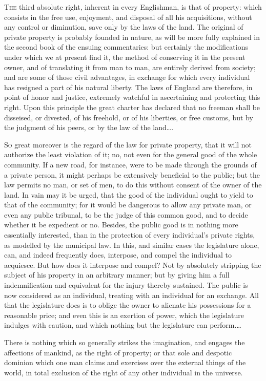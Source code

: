 
\textsc{The}
third absolute right, inherent in every Englishman, is that of property:
which consists in the free use, enjoyment, and disposal of all his
acquisitions, without any control or diminution, save only by the laws of the
land. The original of private property is probably founded in nature, as will
be more fully explained in the second book of the ensuing commentaries: but
certainly the modifications under which we at present find it, the method of
conserving it in the present owner, and of translating it from man to man, are
entirely derived from society; and are some of those civil advantages, in
exchange for which every individual has resigned a part of his natural liberty.
The laws of England are therefore, in point of honor and justice, extremely
watchful in ascertaining and protecting this right. Upon this principle the
great charter has declared that no freeman shall be disseised, or divested, of
his freehold, or of his liberties, or free customs, but by the judgment of his
peers, or by the law of the land\ldots.


\textsc{So}
great moreover is the regard of the law for private property, that it will
not authorize the least violation of it; no, not even for the general good of
the whole community. If a new road, for instance, were to be made through the
grounds of a private person, it might perhaps be extensively beneficial to the
public; but the law permits no man, or set of men, to do this without consent
of the owner of the land. In vain may it be urged, that the good of the
individual ought to yield to that of the community; for it would be dangerous
to allow any private man, or even any public tribunal, to be the judge of this
common good, and to decide whether it be expedient or no. Besides, the public
good is in nothing more essentially interested, than in the protection of every
individual's private rights, as modelled by the municipal law. In this, and
similar cases the legislature alone, can, and indeed frequently does,
interpose, and compel the individual to acquiesce. But how does it interpose
and compel? Not by absolutely stripping the subject of his property in an
arbitrary manner; but by giving him a full indemnification and equivalent for
the injury thereby sustained. The public is now considered as an individual,
treating with an individual for an exchange. All that the legislature does is
to oblige the owner to alienate his possessions for a reasonable price; and
even this is an exertion of power, which the legislature indulges with caution,
and which nothing but the legislature can perform.\ldots

There is nothing which so generally strikes the imagination, and engages the
affections of mankind, as the right of property; or that sole and despotic
dominion which one man claims and exercises over the external things of the
world, in total exclusion of the right of any other individual in the universe.


